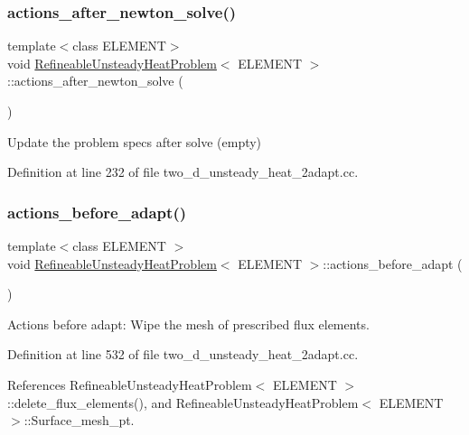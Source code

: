 \subsubsection{\texorpdfstring{actions\+\_\+after\+\_\+newton\+\_\+solve()}{actions\_after\_newton\_solve()}}
{\footnotesize\ttfamily template$<$class E\+L\+E\+M\+E\+NT$>$ \\
void \hyperlink{classRefineableUnsteadyHeatProblem}{Refineable\+Unsteady\+Heat\+Problem}$<$ E\+L\+E\+M\+E\+NT $>$\+::actions\+\_\+after\+\_\+newton\+\_\+solve (\begin{DoxyParamCaption}{ }\end{DoxyParamCaption})\hspace{0.3cm}{\ttfamily [inline]}}



Update the problem specs after solve (empty) 



Definition at line 232 of file two\+\_\+d\+\_\+unsteady\+\_\+heat\+\_\+2adapt.\+cc.

\mbox{\label{classRefineableUnsteadyHeatProblem_a4419fcea0ccbf0509f1d5dd37d8301de}} 
\subsubsection{\texorpdfstring{actions\+\_\+before\+\_\+adapt()}{actions\_before\_adapt()}}
{\footnotesize\ttfamily template$<$class E\+L\+E\+M\+E\+NT $>$ \\
void \hyperlink{classRefineableUnsteadyHeatProblem}{Refineable\+Unsteady\+Heat\+Problem}$<$ E\+L\+E\+M\+E\+NT $>$\+::actions\+\_\+before\+\_\+adapt (\begin{DoxyParamCaption}{ }\end{DoxyParamCaption})}



Actions before adapt\+: Wipe the mesh of prescribed flux elements. 



Definition at line 532 of file two\+\_\+d\+\_\+unsteady\+\_\+heat\+\_\+2adapt.\+cc.



References Refineable\+Unsteady\+Heat\+Problem$<$ E\+L\+E\+M\+E\+N\+T $>$\+::delete\+\_\+flux\+\_\+elements(), and Refineable\+Unsteady\+Heat\+Problem$<$ E\+L\+E\+M\+E\+N\+T $>$\+::\+Surface\+\_\+mesh\+\_\+pt.

